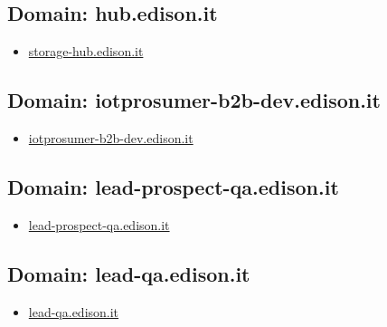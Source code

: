 \documentclass{article}
\begin{document}
    \subsection{Domain: hub.edison.it}
    \begin{itemize}
        
            
                
                \item \href{ http://storage-hub.edison.it/}{ storage-hub.edison.it }
            
        
    \end{itemize}

    \subsection{Domain: iotprosumer-b2b-dev.edison.it}
    \begin{itemize}
        
            
                
                \item \href{ http://iotprosumer-b2b-dev.edison.it/}{ iotprosumer-b2b-dev.edison.it }
            
        
    \end{itemize}

    \subsection{Domain: lead-prospect-qa.edison.it}
    \begin{itemize}
        
            
                
                \item \href{ https://lead-prospect-qa.edison.it/}{ lead-prospect-qa.edison.it }
            
        
    \end{itemize}

    \subsection{Domain: lead-qa.edison.it}
    \begin{itemize}
        
            
                
                \item \href{ http://lead-qa.edison.it/}{ lead-qa.edison.it }
            
        
    \end{itemize}
\end{document}
